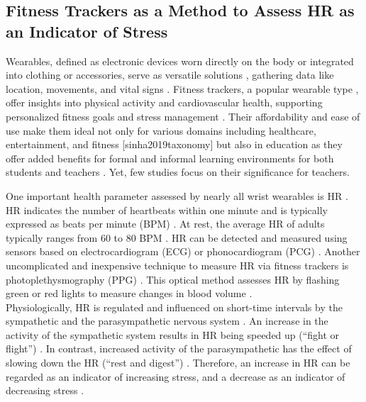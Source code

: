 \documentclass[]{elsarticle} %
\begin{document}
\hypertarget{fitness-trackers-as-a-method-to-assess-hr-as-an-indicator-of-stress}{%
\subsection{Fitness Trackers as a Method to Assess HR as an Indicator of
Stress}\label{fitness-trackers-as-a-method-to-assess-hr-as-an-indicator-of-stress}}

Wearables, defined as electronic devices worn directly on the body or
integrated into clothing or accessories, serve as versatile solutions
\citep{godfrey2018z}, gathering data like location, movements, and vital
signs \citep{cheng2017underlying}. Fitness trackers, a popular wearable
type \citep{park2020user}, offer insights into physical activity and
cardiovascular health, supporting personalized fitness goals
\citep{nuss2021effects} and stress management \citep{hao2018chrv}. Their
affordability and ease of use make them ideal not only for various
domains including healthcare, entertainment, and fitness
{[}sinha2019taxonomy{]} but also in education as they offer added
benefits for formal and informal learning environments for both students
and teachers \citep{de2017towards}. Yet, few studies focus on their
significance for teachers.

One important health parameter assessed by nearly all wrist wearables is
HR \citep{scalise2018wearables}. HR indicates the number of heartbeats
within one minute and is typically expressed as beats per minute (BPM)
\citep{hottenrott2007}. At rest, the average HR of adults typically
ranges from 60 to 80 BPM \citep{sammito2015guideline}. HR can be
detected and measured using sensors based on electrocardiogram (ECG) or
phonocardiogram (PCG) \citep{mukhopadhyay2017wearable}. Another
uncomplicated and inexpensive technique to measure HR via fitness
trackers is photoplethysmography (PPG) \citep{castaneda2018review}. This
optical method assesses HR by flashing green or red lights to measure
changes in blood volume \citep{allen2007photoplethysmography}.\\
Physiologically, HR is regulated and influenced on short-time intervals
by the sympathetic and the parasympathetic nervous system
\citep{pham2021}. An increase in the activity of the sympathetic system
results in HR being speeded up (``fight or flight'')
\citep{taelman2009influence}. In contrast, increased activity of the
parasympathetic has the effect of slowing down the HR (``rest and
digest'') \citep{battipaglia2015}. Therefore, an increase in HR can be
regarded as an indicator of increasing stress, and a decrease as an
indicator of decreasing stress \citep{kyriacou1978}.
\end{document}
